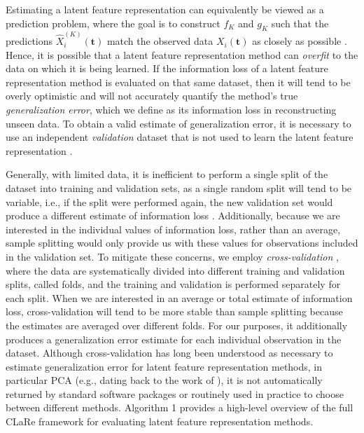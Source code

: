 Estimating a latent feature representation can equivalently be viewed as a prediction problem, where the goal is to construct $f_{K}$ and $g_K$ such that the predictions $\widehat{X}_i^{(K)}(\mathbf{t})$ match the observed data $X_i(\mathbf{t})$ as closely as possible \parencite{krzanowski_cross-validation_1987, wold_cross-validatory_1978, diana_cross-validation_2002, bro_cross-validation_2008}.
Hence, it is possible that a latent feature representation method can \emph{overfit} to the data on which it is being learned.
If the information loss of a latent feature representation method is evaluated on that same dataset, then it will tend to be overly optimistic and will not accurately quantify the method's true \emph{generalization error}, which we define as its information loss in reconstructing unseen data.
To obtain a valid estimate of generalization error, it is necessary to use an independent \emph{validation} dataset that is not used to learn the latent feature representation \parencite{diana_cross-validation_2002, bro_cross-validation_2008}.


Generally, with limited data, it is inefficient to perform a single split of the dataset into training and validation sets, as a single random split will tend to be variable, i.e., if the split were performed again, the new validation set would produce a different estimate of information loss \parencite[Table 1]{collins_evaluation_2024}.
Additionally, because we are interested in the individual values of information loss, rather than an average, sample splitting would only provide us with these values for observations included in the validation set. 
To mitigate these concerns, we employ \emph{cross-validation} \parencite{stone_cross-validatory_1974}, where the data are systematically divided into different training and validation splits, called folds, and the training and validation is performed separately for each split.
When we are interested in an average or total estimate of information loss, cross-validation will tend to be more stable than sample splitting because the estimates are averaged over different folds.
For our purposes, it additionally produces a generalization error estimate for each individual observation in the dataset.
Although cross-validation has long been understood as necessary to estimate generalization error for latent feature representation methods, in particular PCA (e.g., dating back to the work of \textcite{wold_cross-validatory_1978, eastment_cross-validatory_1982, krzanowski_cross-validation_1987}), it is not automatically returned by standard software packages or routinely used in practice to choose between different methods.
Algorithm 1 provides a high-level overview of the full CLaRe framework for evaluating latent feature representation methods.


